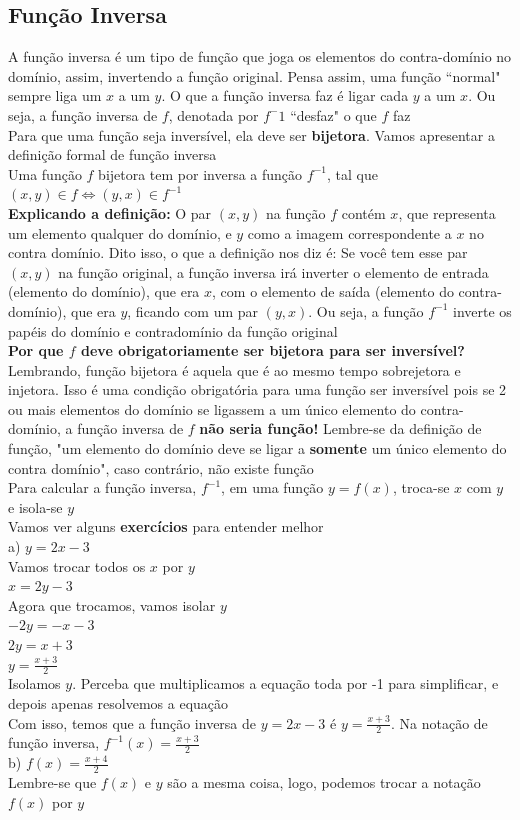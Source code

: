 \documentclass{article}
\begin{document}
\subsection{Função Inversa}
A função inversa é um tipo de função que joga os elementos do contra-domínio no domínio, assim, invertendo a função original. Pensa assim, uma função ``normal" sempre liga um $x$ a um $y$. O que a função inversa faz é ligar cada $y$ a um $x$. Ou seja, a função inversa de $f$, denotada por $f^-1$ ``desfaz" o que $f$ faz\\[10pt]
Para que uma função seja inversível, ela deve ser \textbf{bijetora}. Vamos apresentar a definição formal de função inversa\\[10pt]
Uma função $f$ bijetora tem por inversa a função $f^{-1}$, tal que $(x, y) \in f \Longleftrightarrow (y, x) \in f^{-1}$\\[10pt]
\textbf{Explicando a definição:} O par $(x, y)$ na função $f$ contém $x$, que representa um elemento qualquer do domínio, e $y$ como a imagem correspondente a $x$ no contra domínio. Dito isso, o que a definição nos diz é: Se você tem esse par $(x, y)$ na função original, a função inversa irá inverter o elemento de entrada (elemento do domínio), que era $x$, com o elemento de saída (elemento do contra-domínio), que era $y$, ficando com um par $(y, x)$. Ou seja, a função $f^{-1}$ inverte os papéis do domínio e contradomínio da função original\\[10pt]
\textbf{Por que $f$ deve obrigatoriamente ser bijetora para ser inversível?}\\
Lembrando, função bijetora é aquela que é ao mesmo tempo sobrejetora e injetora. Isso é uma condição obrigatória para uma função ser inversível pois se 2 ou mais elementos do domínio se ligassem a um único elemento do contra-domínio, a função inversa de $f$ \textbf{não seria função!} Lembre-se da definição de função, "um elemento do domínio deve se ligar a \textbf{somente} um único elemento do contra domínio", caso contrário, não existe função\\[10pt]
Para calcular a função inversa, $f^{-1}$, em uma função $y = f(x)$, troca-se $x$ com $y$ e isola-se $y$\\[10pt]
Vamos ver alguns \textbf{exercícios} para entender melhor\\[10pt]
a) $y = 2x - 3$\\[5pt]Vamos trocar todos os $x$ por $y$\\[5pt]
$x = 2y - 3$\\[5pt]Agora que trocamos, vamos isolar $y$\\[5pt]
$-2y = -x -3$\\[5pt]$2y = x + 3$\\[5pt]$y = \frac{x + 3}{2}$\\[5pt]Isolamos $y$. Perceba que multiplicamos a equação toda por -1 para simplificar, e depois apenas resolvemos a equação\\[5pt]
Com isso, temos que a função inversa de $y = 2x - 3$ é $y = \frac{x + 3}{2}$. Na notação de função inversa, $f^{-1}(x) = \frac{x + 3}{2}$\\[20pt]
b) $f(x) = \frac{x + 4}{2}$\\[5pt] Lembre-se que $f(x)$ e $y$ são a mesma coisa, logo, podemos trocar a notação $f(x)$ por $y$
\end{document}
